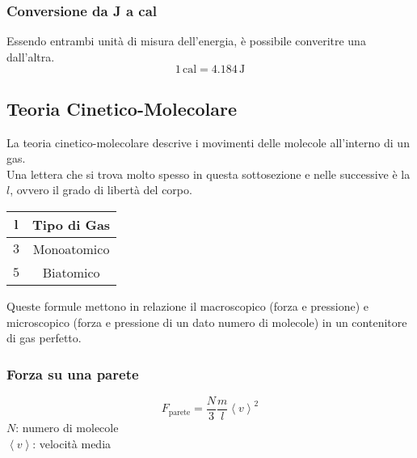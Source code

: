 \subsubsection{Conversione da J a cal}
Essendo entrambi unità di misura dell'energia, è possibile converitre una dall'altra.
\begin{equation*}
1\,\text{cal} = 4.184\,\text{J}
\end{equation*}

\subsection{Teoria Cinetico-Molecolare}
La teoria cinetico-molecolare descrive i movimenti delle molecole all'interno di un gas.\\
Una lettera che si trova molto spesso in questa sottosezione e nelle successive è la $l$, ovvero
il grado di libertà del corpo.\\
\begin{center}
  \begin{tabular}{c c}
    $\boldsymbol{l}$ & \textbf{Tipo di Gas}\\ \hline
    $3$ & Monoatomico \\ \hline
    $5$ & Biatomico\\
  \end{tabular}
\end{center}
Queste formule mettono in relazione il macroscopico (forza e pressione) e microscopico (forza e 
pressione di un dato numero di molecole) in un contenitore di gas perfetto.

\begin{center}
\end{center}

\subsubsection{Forza su una parete}
\begin{equation*}
  F_{\text{parete}} = \frac{N}{3}\frac{m}{l}\left\langle v\right\rangle^2
\end{equation*}
$N$: numero di molecole\\
$\left\langle v\right\rangle$: velocità media

